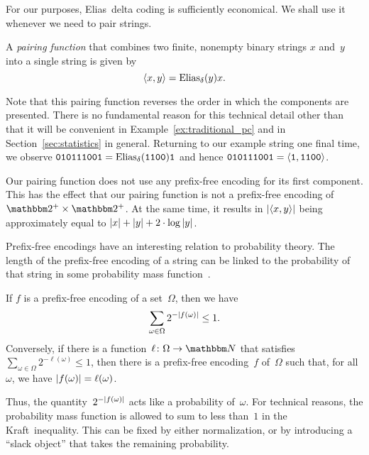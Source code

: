 For our purposes, Elias~delta coding is sufficiently economical.
We shall use it whenever we need to pair strings.
\begin{definition}
\label{def:pairing_function}%
  A \emph{pairing function} that combines two finite, nonempty binary strings $x$ and~$y$ into a single string is given by
  \begin{equation*}
    {\langle x, y\rangle} = \operatorname{Elias}_\delta(y)x.
  \end{equation*}
\end{definition}

Note that this pairing function reverses the order in which the components are presented.
There is no fundamental reason for this technical detail other than that it will be convenient in Example~\ref{ex:traditional_pc} and in Section~\ref{sec:statistics} in general.
Returning to our example string one final time, we observe $\textnormal{\texttt{010111001}} = \operatorname{Elias}_\delta(\textnormal{\texttt{1100}})\textnormal{\texttt{1}}$ and hence $\textnormal{\texttt{010111001}} = {\langle \textnormal{\texttt{1}}, \textnormal{\texttt{1100}}\rangle}$.

Our pairing function does not use any prefix-free encoding for its first component.
This has the effect that our pairing function is not a prefix-free encoding of~$\binary^+ \times \binary^+$.
At the same time, it results in ${\lvert{\langle x, y\rangle}\rvert}$ being approximately equal to ${\lvert x\rvert} + {\lvert y\rvert} + 2 \cdot \log {\lvert y\rvert}$.

Prefix-free encodings have an interesting relation to probability theory.
The length of the prefix-free encoding of a string can be linked to the probability of that string in some probability mass function~\parencite{cover2006elements,li2008introduction}.
\begin{theorem}
  If $f$ is a prefix-free encoding of a set~$\Omega$, then we have
  \begin{equation*}
    \sum_{\omega \in \Omega} 2^{-{\lvert f(\omega)\rvert}} \le 1.
  \end{equation*}
  Conversely, if there is a function~$\ell\colon \Omega \to \bbN$ that satisfies $\sum_{\omega \in \Omega} 2^{-\ell(\omega)} \le 1$, then there is a prefix-free encoding~$f$ of~$\Omega$ such that, for all $\omega$, we have ${\lvert f(\omega)\rvert} = \ell(\omega)$.
\end{theorem}
Thus, the quantity~$2^{-{\lvert f(\omega)\rvert}}$ acts like a probability of~$\omega$.
For technical reasons, the probability mass function is allowed to sum to less than~$1$ in the Kraft~inequality.
This can be fixed by either normalization, or by introducing a \enquote{slack object} that takes the remaining probability.


